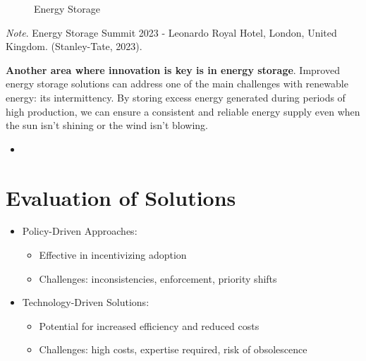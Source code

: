 \documentclass[
  letterpaper,
  DIV=11,
  numbers=noendperiod]{scrartcl}
\providecommand{\tightlist}{%
  \setlength{\itemsep}{0pt}\setlength{\parskip}{0pt}}\usepackage{longtable,booktabs,array}
\begin{document}
\begin{figure}


\caption{\label{fig-solutions}Energy Storage}

\end{figure}%

\emph{Note}. Energy Storage Summit 2023 - Leonardo Royal Hotel, London,
United Kingdom. (Stanley-Tate, 2023).

\textbf{Another area where innovation is key is in energy storage}.
Improved energy storage solutions can address one of the main challenges
with renewable energy: its intermittency. By storing excess energy
generated during periods of high production, we can ensure a consistent
and reliable energy supply even when the sun isn't shining or the wind
isn't blowing.

\begin{itemize}
\tightlist
\item
\end{itemize}

\section{Evaluation of Solutions}\label{evaluation-of-solutions}

\begin{itemize}
\tightlist
\item
  Policy-Driven Approaches:

  \begin{itemize}
  \tightlist
  \item
    Effective in incentivizing adoption
  \item
    Challenges: inconsistencies, enforcement, priority shifts
  \end{itemize}
\item
  Technology-Driven Solutions:

  \begin{itemize}
  \tightlist
  \item
    Potential for increased efficiency and reduced costs
  \item
    Challenges: high costs, expertise required, risk of obsolescence
  \end{itemize}
\end{itemize}
\end{document}
